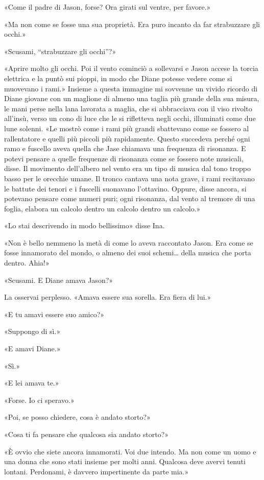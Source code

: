 «Come il padre di Jason, forse? Ora girati sul ventre, per favore.»

«Ma non come se fosse una sua proprietà. Era puro incanto da far
strabuzzare gli occhi.»

«Scusami, ``strabuzzare gli occhi''?»

«Aprire molto gli occhi. Poi il vento cominciò a sollevarsi e Jason
accese la torcia elettrica e la puntò sui pioppi, in modo che Diane
potesse vedere come si muovevano i rami.» Insieme a questa immagine mi
sovvenne un vivido ricordo di Diane giovane con un maglione di almeno
una taglia più grande della sua misura, le mani perse nella lana
lavorata a maglia, che si abbracciava con il viso rivolto all'insù,
verso un cono di luce che le si rifletteva negli occhi, illuminati come
due lune solenni. «Le mostrò come i rami più grandi sbattevano come se
fossero al rallentatore e quelli più piccoli più rapidamente. Questo
succedeva perché ogni ramo e fuscello aveva quella che Jase chiamava una
frequenza di risonanza. E potevi pensare a quelle frequenze di risonanza
come se fossero note musicali, disse. Il movimento dell'albero nel vento
era un tipo di musica dal tono troppo basso per le orecchie umane. Il
tronco cantava una nota grave, i rami recitavano le battute dei tenori e
i fuscelli suonavano l'ottavino. Oppure, disse ancora, si potevano
pensare come numeri puri; ogni risonanza, dal vento al tremore di una
foglia, elabora un calcolo dentro un calcolo dentro un calcolo.»

«Lo stai descrivendo in modo bellissimo» disse Ina.

«Non è bello nemmeno la metà di come lo aveva raccontato Jason. Era come
se fosse innamorato del mondo, o almeno dei suoi schemi\ldots{} della
musica che porta dentro. Ahia!»

«Scusami. E Diane amava Jason?»

La osservai perplesso. «Amava essere sua sorella. Era fiera di lui.»

«E tu amavi essere suo amico?»

«Suppongo di sì.»

«E amavi Diane.»

«Sì.»

«E lei amava te.»

«Forse. Io ci speravo.»

«Poi, se posso chiedere, cosa è andato storto?»

«Cosa ti fa pensare che qualcosa sia andato storto?»

«È ovvio che siete ancora innamorati. Voi due intendo. Ma non come un
uomo e una donna che sono stati insieme per molti anni. Qualcosa deve
avervi tenuti lontani. Perdonami, è davvero impertinente da parte mia.»

